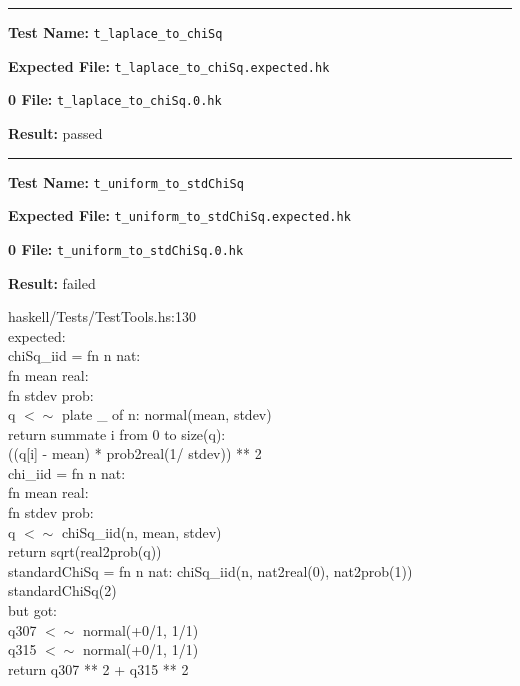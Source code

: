 \documentclass[11pt]{article}
\begin{document}
\hrule

\bigskip
\textbf{Test Name:} {\tt t\_laplace\_to\_chiSq}

\textbf{Expected File:} {\tt t\_laplace\_to\_chiSq.expected.hk}

\bigskip


\bigskip
\textbf{0 File:} {\tt t\_laplace\_to\_chiSq.0.hk}

\bigskip


\bigskip
\textbf{Result:} passed

\bigskip
\hrule

\bigskip
\textbf{Test Name:} {\tt t\_uniform\_to\_stdChiSq}

\textbf{Expected File:} {\tt t\_uniform\_to\_stdChiSq.expected.hk}

\bigskip


\bigskip
\textbf{0 File:} {\tt t\_uniform\_to\_stdChiSq.0.hk}

\bigskip


\bigskip
\textbf{Result:} failed

\bigskip
\noindent
haskell/Tests/TestTools.hs:130\\expected:\\chiSq\_iid = fn n nat:\\            fn mean real:\\            fn stdev prob:\\            q $<\sim$ plate \_ of n: normal(mean, stdev)\\            return summate i from 0 to size(q):\\                   ((q[i] - mean) * prob2real(1/ stdev)) ** 2\\chi\_iid = fn n nat:\\          fn mean real:\\          fn stdev prob:\\          q $<\sim$ chiSq\_iid(n, mean, stdev)\\          return sqrt(real2prob(q))\\standardChiSq = fn n nat: chiSq\_iid(n, nat2real(0), nat2prob(1))\\standardChiSq(2)\\but got:\\q307 $<\sim$ normal(+0/1, 1/1)\\q315 $<\sim$ normal(+0/1, 1/1)\\return q307 ** 2 + q315 ** 2\\
\end{document}
